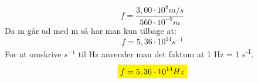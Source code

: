 \begin{equation*}
    f=\frac{3,00 \cdot 10^{8} m/s}{560 \cdot 10^{-9} m}
\end{equation*}
Da m går ud med m så har man kun tilbage at:
\begin{equation*}
    f=5,36 \cdot 10^{14} s^{-1}
\end{equation*}
For at omskrive \begin{math}s^{-1}\end{math} til Hz anvender man det faktum at 1 Hz = 1 s\textsuperscript{-1}.
\textbf{\begin{equation*}
    \mathcolorbox{yellow}{f=5,36 \cdot 10^{14} Hz}
\end{equation*}}

